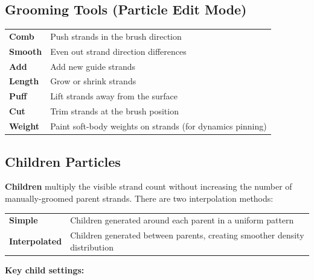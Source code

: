 \subsection{Grooming Tools (Particle Edit Mode)}

\begin{center}
\begin{tabularx}{\textwidth}{L{2.5cm}X}
\toprule
{}
 &  \\
\midrule
\textbf{Comb} & Push strands in the brush direction \\
\textbf{Smooth} & Even out strand direction differences \\
\textbf{Add} & Add new guide strands \\
\textbf{Length} & Grow or shrink strands \\
\textbf{Puff} & Lift strands away from the surface \\
\textbf{Cut} & Trim strands at the brush position \\
\textbf{Weight} & Paint soft-body weights on strands (for dynamics pinning) \\
\bottomrule
\end{tabularx}
\end{center}

\subsection{Children Particles}

\textbf{Children} multiply the visible strand count without increasing the number of manually-groomed parent strands. There are two interpolation methods:

\begin{center}
\begin{tabularx}{\textwidth}{L{2.5cm}X}
\toprule
{}
 &  \\
\midrule
\textbf{Simple} & Children generated around each parent in a uniform pattern \\
\textbf{Interpolated} & Children generated between parents, creating smoother density distribution \\
\bottomrule
\end{tabularx}
\end{center}

\textbf{Key child settings:}


